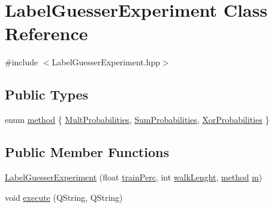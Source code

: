 \hypertarget{class_label_guesser_experiment}{\section{Label\+Guesser\+Experiment Class Reference}
\label{class_label_guesser_experiment}
}


{\ttfamily \#include $<$Label\+Guesser\+Experiment.\+hpp$>$}

\subsection*{Public Types}
\begin{DoxyCompactItemize}
\item 
enum \hyperlink{class_label_guesser_experiment_a8c3db06a56bf1ad7513c20a7b80da3ec}{method} \{ \hyperlink{class_label_guesser_experiment_a8c3db06a56bf1ad7513c20a7b80da3eca1cde43306c88632461a9c42260a030fc}{Mult\+Probabilities}, 
\hyperlink{class_label_guesser_experiment_a8c3db06a56bf1ad7513c20a7b80da3eca648e260351661fcd059db11046e060bc}{Sum\+Probabilities}, 
\hyperlink{class_label_guesser_experiment_a8c3db06a56bf1ad7513c20a7b80da3eca1ec77d74a50b79782fda1db1fae44a26}{Xor\+Probabilities}
 \}
\end{DoxyCompactItemize}
\subsection*{Public Member Functions}
\begin{DoxyCompactItemize}
\item 
\hyperlink{class_label_guesser_experiment_a23665584de9eb0f70c52f35c5f2e3473}{Label\+Guesser\+Experiment} (float \hyperlink{class_label_guesser_experiment_a24da553164e05d31f67156c70b946fef}{train\+Perc}, int \hyperlink{class_label_guesser_experiment_a5038af94a1310577da234f589c19c77e}{walk\+Lenght}, \hyperlink{class_label_guesser_experiment_a8c3db06a56bf1ad7513c20a7b80da3ec}{method} \hyperlink{class_label_guesser_experiment_a0a0032a29818ba490865d85ac1403b0d}{m})
\item 
void \hyperlink{class_label_guesser_experiment_ac59f249adb0e74044f30f2847006743f}{execute} (Q\+String, Q\+String)
\end{DoxyCompactItemize}
